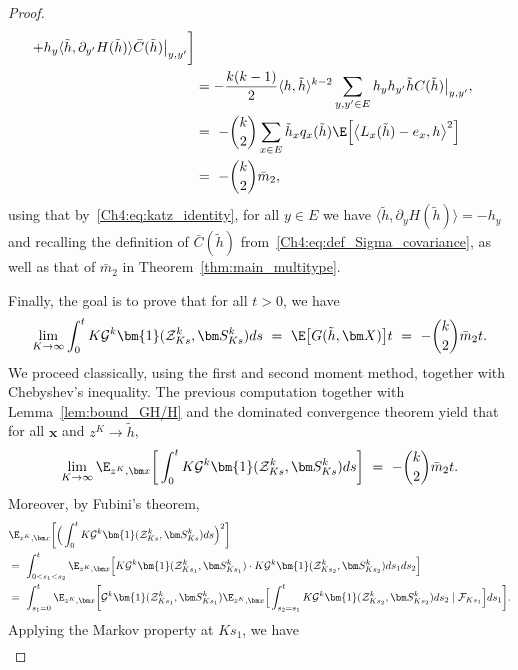 \begin{refsegment}
\begin{proof}
\begin{align*}
+ h_y\langle \tilde h, \partial_{y'}H(\tilde h)\rangle\bar C(\tilde h)\big|_{y,y'}\bigg]\\
&=  -\frac{k(k-1)}{2}\langle h, \tilde h\rangle^{k-2}\sum_{y,y'\in E} h_{y}h_{y'}\tilde h C(\tilde h)\big|_{y,y'},\\
&=\ - \binom{k}{2}\sum_{x\in E} \tilde h_x q_x(\tilde h)\E\Big[\big\langle L_x(\tilde h)-e_x, h\big\rangle^2\Big] \\
 & =\ - \binom{k}{2}\bar m_2 ,
\end{align*}
using that by~\eqref{Ch4:eq:katz_identity}, for all $y\in E$ we have $\langle \tilde h, \partial_y H(\tilde h)\rangle = -h_y$ and recalling the definition of $\bar C(\tilde h)$ from~\eqref{Ch4:eq:def_Sigma_covariance}, as well as that of $\bar m_2$ in Theorem~\ref{thm:main_multitype}.

Finally, the goal is to prove that for all $t>0$, we have
    \begin{equation}\label{Ch4:eq:ergodicity}
    \lim_{K\to\infty }\int_0^t  K\mathcal{G}^k\bm{1}(\mathcal{Z}^k_{Ks}, \bm S^k_{Ks}) ds\ =\ \E\big[G(\tilde h, \bm X)\big]  t\ =\ -\binom{k}{2}\bar m_2 t.
    \end{equation}
  We proceed classically, using the first and second moment method, together with Chebyshev's inequality.
 The previous computation together with Lemma~\ref{lem:bound_GH/H} and the dominated convergence theorem yield that for all $\bm x$ and $z^K\to\tilde h$,
 \begin{equation}\label{Ch4:eq:first_moment}
    \lim_{K\to\infty }\E_{z^K,\bm x}\bigg[\int_0^t  K\mathcal{G}^k\bm{1}(\mathcal{Z}^k_{Ks}, \bm S^k_{Ks}) ds\bigg]\ =\ -\binom{k}{2}\bar m_2 t.
 \end{equation}
Moreover, by Fubini's theorem, 
 \begin{align*}
   &\E_{z^K,\bm x}\bigg[\Big(\int_0^t  K\mathcal{G}^k\bm{1}(\mathcal{Z}^k_{Ks}, \bm S^k_{Ks}) ds\Big)^2\bigg]\\
    &=\ \int_{0<s_1<s_2}^t \E_{z^K,\bm x}\Big[ K\mathcal{G}^k\bm{1}(\mathcal{Z}^k_{Ks_1}, \bm S^k_{Ks_1}) \cdot K\mathcal{G}^k\bm{1}(\mathcal{Z}^k_{Ks_2}, \bm S^k_{Ks_2})ds_1 ds_2 \Big]\\
 & =\ \int_{s_1=0}^t \E_{z^K, \bm x}\bigg[\mathcal{G}^k\bm{1}(\mathcal{Z}^k_{Ks_1}, \bm S^k_{Ks_1}) \E_{z^K,\bm x}\Big[\int_{s_2=s_1}^t   K\mathcal{G}^k\bm{1}(\mathcal{Z}^k_{Ks_2}, \bm S^k_{Ks_2})ds_2 \mid \mathcal{F}_{Ks_1}\Big]  ds_1  \bigg].
    \end{align*}
    Applying the Markov property at $Ks_1$, we have
\begin{multline}\label{Ch4:eq:second_moment}

\end{multline}
\end{proof}
\end{refsegment}
